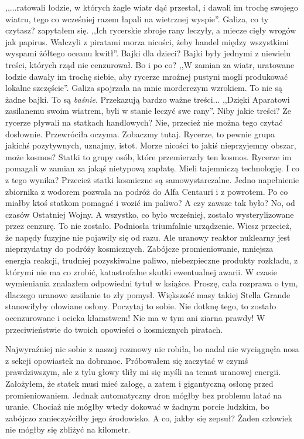 \begin{dialogue}
	\ds{} ,,...ratowali łodzie, w których żagle wiatr dąć przestał, i dawali im trochę swojego wiatru, tego co wcześniej razem łapali na wietrznej wyspie''.
	\ds{} Galiza, co ty czytasz? \dm{} zapytałem się.
	\ds{} ,,Ich rycerskie zbroje rany leczyły, a miecze cięły wrogów jak papirus. Walczyli z piratami morza nicości, żeby handel między wszystkimi wyspami żółtego oceanu kwitł''.
	\ds{} Bajki dla dzieci? \dm{} Bajki były jednymi z niewielu treści, których rząd nie cenzurował. Bo i po co?
	\ds{} ,,W zamian za wiatr, uratowane łodzie dawały im trochę siebie, aby rycerze mroźnej pustyni mogli produkować lokalne szczęście''. \dm{} Galiza spojrzała na mnie morderczym wzrokiem. \dm{} To nie są żadne bajki. To są \emph{baśnie}. Przekazują bardzo ważne treści... ,,Dzięki Aparatowi zasilanemu swoim wiatrem, byli w stanie leczyć swe rany''.
	\ds{} Niby jakie treści? Że rycerze pływali na statkach handlowych?
	\ds{} Nie, przecież nie można tego czytać dosłownie. \dm{} Przewróciła oczyma. \dm{} Zobaczmy tutaj. Rycerze, to pewnie grupa jakichś pozytywnych, uznajmy, istot. Morze nicości to jakiś nieprzyjemny obszar, może kosmos? Statki to grupy osób, które przemierzały ten kosmos. Rycerze im pomagali w zamian za jakąś nietypową zapłatę. Mieli tajemniczą technologię.
	\ds{} I co z tego wynika? Przecież statki kosmiczne są samowystarczalne. Jedno napełnienie zbiornika z wodorem pozwala na podróż do Alfa Centauri i z powrotem. Po co miałby ktoś statkom pomagać i wozić im paliwo?
	\ds{} A czy zawsze tak było?
	\ds{} No, od czasów Ostatniej Wojny. A wszystko, co było wcześniej, zostało wysterylizowane przez cenzurę.
	\ds{} To nie zostało. \dm{} Podniosła triumfalnie urządzenie. \dm{} Wiesz przecież, że napędy fuzyjne nie pojawiły się od razu.
	\ds{} Ale uranowy reaktor nuklearny jest nieprzydatny do podróży kosmicznych. Zabójcze promieniowanie, mniejsza energia reakcji, trudniej pozyskiwalne paliwo, niebezpieczne produkty rozkładu, z którymi nie ma co zrobić, katastrofalne skutki ewentualnej awarii. \dm{} W czasie wymieniania znalazłem odpowiedni tytuł w książce. \dm{} Proszę, cała rozprawa o tym, dlaczego uranowe zasilanie to zły pomysł. Większość masy takiej Stella Grande stanowiłyby ołowiane osłony. Poczytaj to sobie.
	\ds{} Nie dotknę tego, to zostało ocenzurowane i ocieka kłamstwem! Nie ma w tym ani ziarna prawdy!
	\ds{} W przeciwieństwie do twoich opowieści o kosmicznych piratach.
\end{dialogue}

Najwyraźniej nic sobie z naszej rozmowy nie robiła, bo nadal nie wyciągnęła nosa z sekcji opowiastek na dobranoc.
Próbowałem się zaczytać w czymś prawdziwszym, ale z tylu głowy tliły mi się myśli na temat uranowej energii.
Założyłem, że statek musi mieć załogę, a zatem i gigantyczną osłonę przed promieniowaniem.
Jednak automatyczny dron mógłby bez problemu latać na uranie.
Chociaż nie mógłby wtedy dokować w żadnym porcie ludzkim, bo zabójczo zanieczyściłby jego środowisko.
A co, jakby się zepsuł? Żaden człowiek nie mógłby się zbliżyć na kilometr.

